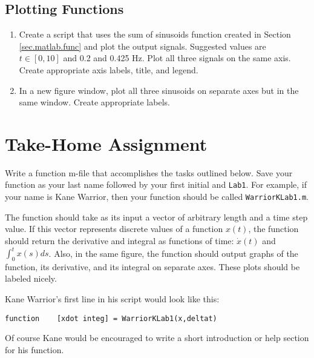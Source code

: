 \subsection{Plotting Functions}
\begin{enumerate}
    \item Create a script that uses the sum of sinusoids function created in Section \ref{sec.matlab.func} and plot the output signals.  Suggested values are $t\in[0,10]$ and 0.2 and 0.425 Hz.  Plot all three signals on the same axis.  Create appropriate axis labels, title, and legend.
    \item In a new figure window, plot all three sinusoids on separate axes but in the same window.  Create appropriate labels.
\end{enumerate}

\section{Take-Home Assignment}
Write a function m-file that accomplishes the tasks outlined below.  Save your function as your last name followed by your first initial and \verb=Lab1=.  For example, if your name is Kane Warrior, then your function should be called \verb=WarriorKLab1.m=.
\par
The function should take as its input a vector of arbitrary length and a time step value.  If this vector represents discrete values of a function $x(t)$, the function should return the derivative and integral as functions of time: $\dot{x}(t)$ and $\int_0^t x(s)ds$.  Also, in the same figure, the function should output graphs of the function, its derivative, and its integral on separate axes.  These plots should be labeled nicely.
\par
Kane Warrior's first line in his script would look like this:
\begin{verbatim}
function    [xdot integ] = WarriorKLab1(x,deltat)
\end{verbatim}
Of course Kane would be encouraged to write a short introduction or help section for his function.

